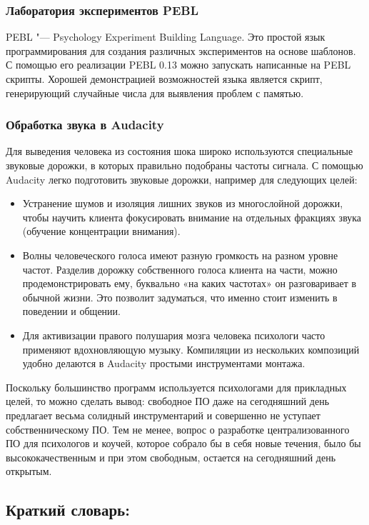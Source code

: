 \documentclass[10pt, a5paper]{article}
\begin{document}
\subsubsection*{Лаборатория экспериментов PEBL}

PEBL "--- Psychology Experiment Building Language. Это простой язык программирования для создания различных экспериментов на основе шаблонов. С помощью его реализации PEBL 0.13 можно запускать написанные на PEBL скрипты. Хорошей демонстрацией возможностей языка является скрипт, генерирующий случайные числа для выявления проблем с памятью.

\subsubsection*{Обработка звука в Audacity}

Для выведения человека из состояния шока широко используются специальные звуковые дорожки, в которых правильно подобраны частоты сигнала. С помощью Audacity легко подготовить звуковые дорожки, например для следующих целей:
\begin{itemize}
 \item	Устранение шумов и изоляция лишних звуков из многослойной дорожки, чтобы научить клиента фокусировать внимание на отдельных фракциях звука (обучение концентрации внимания).
 \item	Волны человеческого голоса имеют разную громкость на разном уровне частот. Разделив дорожку собственного голоса клиента на части, можно продемонстрировать ему, буквально «на каких частотах» он разговаривает в обычной жизни. Это позволит задуматься, что именно стоит изменить в поведении и общении.
 \item	Для активизации правого полушария мозга человека психологи часто применяют вдохновляющую музыку. Компиляции из нескольких композиций удобно делаются в Audacity простыми инструментами монтажа.
\end{itemize}

Поскольку большинство программ используется психологами для прикладных целей, то можно сделать вывод: свободное ПО даже на сегодняшний день предлагает весьма солидный инструментарий и совершенно не уступает собственническому ПО.
	Тем не менее, вопрос о разработке централизованного ПО для психологов и коучей, которое собрало бы в себя новые течения, было бы высококачественным и при этом свободным, остается на сегодняшний день открытым.

\subsection*{Краткий словарь:}
\end{document}
